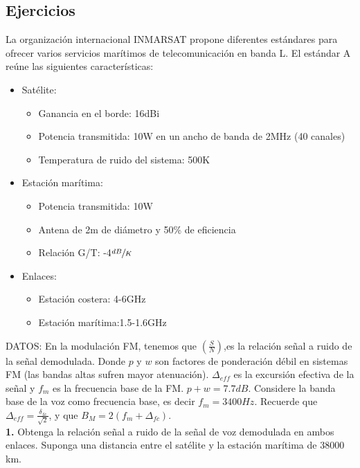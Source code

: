 \subsection{Ejercicios}
\label{sub:ejercicios5}
\begin{exercise}[1]
	La organización internacional INMARSAT propone diferentes estándares para ofrecer varios servicios marítimos de telecomunicación en banda L. El estándar A reúne las siguientes características:
	\begin{itemize}
		\item Satélite:
		\begin{itemize}
			\item Ganancia en el borde: 16dBi
			\item Potencia transmitida: 10W en un ancho de banda de 2MHz (40 canales)
			\item Temperatura de ruido del sistema: 500K
		\end{itemize}
		\item Estación marítima:
		\begin{itemize}
			\item Potencia transmitida: 10W
			\item Antena de 2m de diámetro y 50\% de eficiencia
			\item Relación G/T: -4$\sfrac{dB}{K}$
		\end{itemize}
		\item Enlaces:
		\begin{itemize}
			\item Estación costera: 4-6GHz
			\item Estación marítima:1.5-1.6GHz
		\end{itemize}
	\end{itemize} 
	DATOS: En la modulación FM, tenemos que $(\frac{S}{N})$,es la relación señal a ruido de la señal demodulada. Donde $p$ y $w$ son factores de ponderación débil en sistemas FM (las bandas altas sufren mayor atenuación). $\Delta_{eff}$ es la excursión efectiva de la señal y $f_m$ es la frecuencia base de la FM. $p+w=7.7dB$. Considere la banda base de la voz como frecuencia base, es decir $f_m=3400Hz$. Recuerde que $\Delta_{eff}=\frac{\delta_{fc}}{\sqrt{2}}$, y que $B_M=2(f_m+\Delta_{fc})$.\\
	\textbf{1.} Obtenga la relación señal a ruido de la señal de voz demodulada en ambos enlaces. Suponga una distancia entre el satélite y la estación marítima de 38000 km.
\end{exercise}
